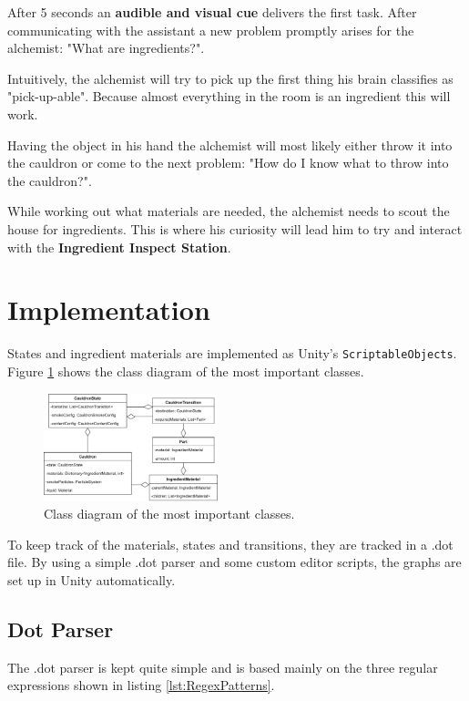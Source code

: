 \documentclass{vgtc}
\begin{document}
After 5 seconds an \textbf{audible and visual cue} delivers the first task. After communicating with the assistant
a new problem promptly arises for the alchemist: "What are ingredients?".

Intuitively, the alchemist will try to pick up the first thing his brain classifies as "pick-up-able". Because
almost everything in the room is an ingredient this will work.

Having the object in his hand the alchemist will most likely either throw it into the cauldron or come to the next
problem: "How do I know what to throw into the cauldron?".

While working out what materials are needed, the alchemist needs to scout the house for ingredients. This is where
his curiosity will lead him to try and interact with the \textbf{Ingredient Inspect Station}.

\section{Implementation}

States and ingredient materials are implemented as Unity's \texttt{ScriptableObjects}. Figure \ref{fig:ClassDiagram} 
shows the class diagram of the most important classes.

\begin{figure}[ht]
  \centering
  \includegraphics[width=0.45\textwidth]{pictures/ClassDiagram.png}
  \caption{Class diagram of the most important classes.}
  \label{fig:ClassDiagram}
\end{figure}

To keep track of the materials, states and transitions, they are tracked in a .dot file. By using a simple .dot parser
and some custom editor scripts, the graphs are set up in Unity automatically.

\subsection{Dot Parser}

The .dot parser is kept quite simple and is based mainly on the three regular expressions shown in listing \ref{lst:RegexPatterns}.
\end{document}
